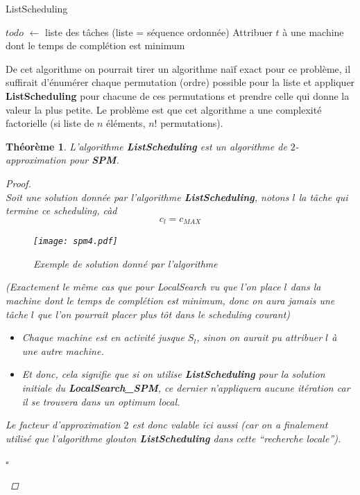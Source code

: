 \documentclass[12pt]{article}
\newcommand{\titre}[1]{\textcolor{title}{#1}}
\newcommand{\cqfd}{\begin{flushright}$\square$\end{flushright}}
\newtheorem{thm}{Th\'eor\`eme}[section]
\newtheorem{proof}{Preuve}[section]
\begin{document}
\begin{algorithm}[H]
\caption{ListScheduling}
\begin{algorithmic}[1]
\STATE $todo$ $\leftarrow$ liste des tâches (liste = séquence ordonnée)
\STATE Attribuer $t$ à une machine dont le temps de complétion est minimum
\ENDFOR
\end{algorithmic}
\end{algorithm}

De cet algorithme on pourrait tirer un algorithme naïf exact pour ce problème, il suffirait d'énumérer chaque permutation (ordre) possible
pour la liste et appliquer \textbf{ListScheduling} pour chacune de ces permutations et prendre celle qui donne la valeur la plus petite. Le
problème est que cet algorithme a une complexité factorielle (si liste de $n$ éléments, $n!$ permutations).



\begin{thm} L'algorithme \textbf{ListScheduling} est un algorithme de $2$-approximation pour \textbf{\titre{SPM}}.
\begin{proof}$ $\\
Soit une solution donnée par l'algorithme \textbf{ListScheduling}, notons $l$ la tâche qui termine ce scheduling, càd $$c_l = c_{MAX}$$

\begin{figure}[H]
    \begin{center}
    \texttt{[image: spm4.pdf]}
    \caption{Exemple de solution donné par l'algorithme}
    \end{center}
\end{figure}

\noindent (Exactement le même cas que pour LocalSearch vu que l'on place $l$ dans la
machine dont le temps de complétion est minimum, donc on aura jamais une tâche
$l$ que l'on pourrait placer plus tôt dans le scheduling courant)

\noindent \begin{itemize}
\item[$\Rightarrow$] Chaque machine est en activité jusque $S_l$, sinon on aurait pu
attribuer $l$ à une autre machine.
\item[$\Rightarrow$] Et donc, cela signifie que si on utilise \textbf{ListScheduling} pour la
solution initiale du \textbf{LocalSearch\_SPM}, ce dernier n'appliquera aucune itération car il se trouvera dans un optimum local. \\
\end{itemize}

\noindent Le facteur d'approximation $2$ est donc valable ici aussi (car on a finalement utilisé que l'algorithme glouton
\textbf{ListScheduling} dans cette ``recherche locale'').
\cqfd
\end{proof}
\end{thm}
\end{document}
